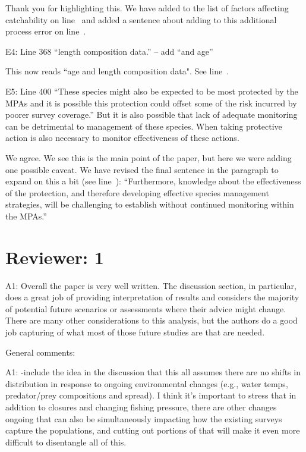 \documentclass[12pt]{article}
\newcommand{\rev}[1]{{\color{niceblue} #1}}
\newcommand{\lr}[1]{line~\lineref{#1}}
\begin{document}
Thank you for highlighting this. We have added to the list of factors affecting catchability on \lr{E3a} and added a sentence about adding to this additional process error on \lr{E3b}.

\rev{E4: Line 368 “length composition data.” – add “and age”}

This now reads ``age and length composition data". See \lr{E4}.

\rev{E5: Line 400 “These species might also be expected to be most protected by the MPAs and it is possible this protection could offset some of the risk incurred by poorer survey coverage.” But it is also possible that lack of adequate monitoring can be detrimental to management of these species. When taking protective action is also necessary to monitor effectiveness of these actions.}

We agree. We see this is the main point of the paper, but here we were adding one possible caveat. We have revised the final sentence in the paragraph to expand on this a bit (see \lr{E5}): ``Furthermore, knowledge about the effectiveness of the protection, and therefore developing effective species management strategies, will be challenging to establish without continued monitoring within the MPAs.''

\section{Reviewer: 1}

\rev{A1: Overall the paper is very well written. The discussion section, in particular, does a great job of providing interpretation of results and considers the majority of potential future scenarios or assessments where their advice might change. There are many other considerations to this analysis, but the authors do a good job capturing of what most of those future studies are that are needed.}

\rev{General comments:}

\rev{A1: -include the idea in the discussion that this all assumes there are no shifts in distribution in response to ongoing environmental changes (e.g., water temps, predator/prey compositions and spread). I think it’s important to stress that in addition to closures and changing fishing pressure, there are other changes ongoing that can also be simultaneously impacting how the existing surveys capture the populations, and cutting out portions of that will make it even more difficult to disentangle all of this.}
\end{document}
